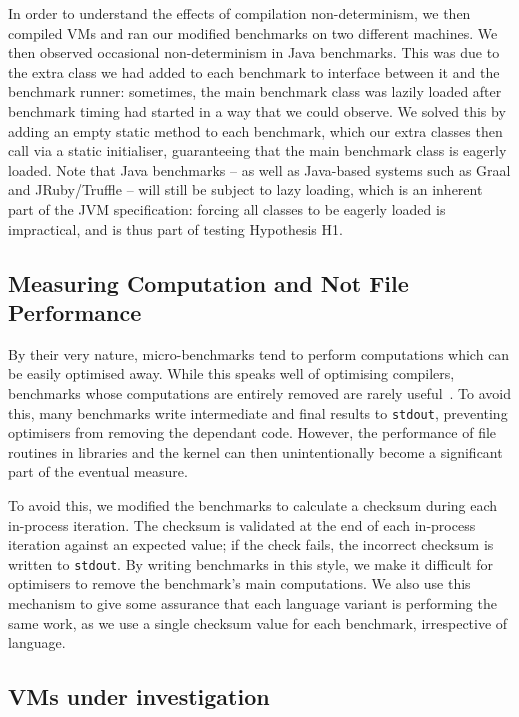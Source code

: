 \documentclass[preprint,numbers,10pt]{sigplanconf}
\begin{document}
In order to understand the effects of compilation non-determinism,
we then compiled VMs and ran our modified benchmarks on two different machines.
We then observed occasional non-determinism in Java benchmarks.
This was due to the extra class we had added to each benchmark
to interface between it and the benchmark runner: sometimes, the
main benchmark class was lazily loaded after benchmark timing had started in a
way that we could observe. We
solved this by adding an empty static method to each benchmark, which our
extra classes then call via a static initialiser, guaranteeing that
the main benchmark class is eagerly loaded. Note that Java
benchmarks -- as well as
Java-based systems such as Graal and JRuby/Truffle -- will still be subject to
lazy loading, which is an inherent part of the JVM specification: forcing all
classes to be eagerly loaded is impractical, and is thus part of testing
Hypothesis H1.


\subsection{Measuring Computation and Not File Performance}

By their very nature, micro-benchmarks tend to perform computations which
can be easily optimised away. While this speaks well of
optimising compilers, benchmarks whose computations
are entirely removed are rarely useful~\cite{seaton15phd}. To avoid this,
many benchmarks write intermediate and final results
to \texttt{stdout}, preventing optimisers from removing the dependant code.
However, the performance of file routines in libraries and the kernel can then
unintentionally become a significant part of the eventual measure.

To avoid this, we modified the benchmarks to calculate a checksum
during each in-process iteration.
The checksum is validated at the end of each in-process iteration against an expected
value; if the check fails, the incorrect checksum is written to \texttt{stdout}.
By writing benchmarks in
this style, we make it difficult for optimisers to remove the
benchmark's main computations. We also use this mechanism to give some assurance
that each language variant is performing the same work, as we use a single
checksum value for each benchmark, irrespective of language.


\subsection{VMs under investigation}
\end{document}
